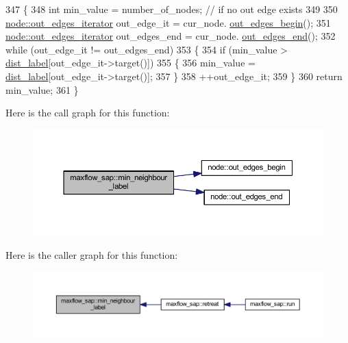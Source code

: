 \begin{DoxyCode}
347 \{
348     \textcolor{keywordtype}{int} min\_value = number\_of\_nodes;    \textcolor{comment}{// if no out edge exists}
349 
350     \mbox{\hyperlink{classnode_a90e17ed34de55072e8077f4367499a98}{node::out\_edges\_iterator}} out\_edge\_it = cur\_node.
      \mbox{\hyperlink{classnode_a7dcb80df22118cea04f77ca8c952d9c2}{out\_edges\_begin}}();
351     \mbox{\hyperlink{classnode_a90e17ed34de55072e8077f4367499a98}{node::out\_edges\_iterator}} out\_edges\_end = cur\_node.
      \mbox{\hyperlink{classnode_a7ce2ba5195a63d4df6b44299a02a9378}{out\_edges\_end}}();
352     \textcolor{keywordflow}{while} (out\_edge\_it != out\_edges\_end)
353     \{
354         \textcolor{keywordflow}{if} (min\_value > \mbox{\hyperlink{classmaxflow__sap_a14eef09823ae0ac69348c2b3a60e6ca3}{dist\_label}}[out\_edge\_it->target()])
355         \{
356             min\_value = \mbox{\hyperlink{classmaxflow__sap_a14eef09823ae0ac69348c2b3a60e6ca3}{dist\_label}}[out\_edge\_it->target()];
357         \}
358         ++out\_edge\_it;
359     \}
360     \textcolor{keywordflow}{return} min\_value;
361 \}
\end{DoxyCode}
Here is the call graph for this function\+:\nopagebreak
\begin{figure}[H]
\begin{center}
\leavevmode
\includegraphics[width=350pt]{classmaxflow__sap_a7cf86463129a569f41883fdad6869fce_cgraph}
\end{center}
\end{figure}
Here is the caller graph for this function\+:\nopagebreak
\begin{figure}[H]
\begin{center}
\leavevmode
\includegraphics[width=350pt]{classmaxflow__sap_a7cf86463129a569f41883fdad6869fce_icgraph}
\end{center}
\end{figure}
\mbox{\label{classmaxflow__sap_a4504b071456d536371ff6d07055e800d}} 
